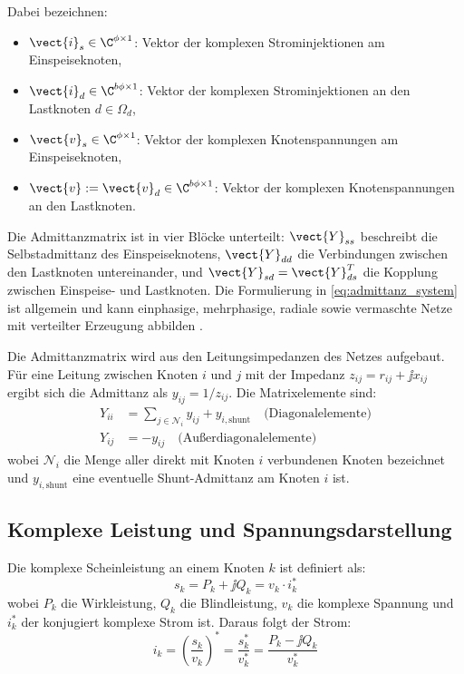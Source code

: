 Dabei bezeichnen:
\begin{itemize}
	\item $\vect{i}_s \in \C^{\phi \times 1}$: Vektor der komplexen Strominjektionen am Einspeiseknoten,
	\item $\vect{i}_d \in \C^{b\phi \times 1}$: Vektor der komplexen Strominjektionen an den Lastknoten $d \in \Omega_d$,
	\item $\vect{v}_s \in \C^{\phi \times 1}$: Vektor der komplexen Knotenspannungen am Einspeiseknoten,
	\item $\vect{v} := \vect{v}_d \in \C^{b\phi \times 1}$: Vektor der komplexen Knotenspannungen an den Lastknoten.
\end{itemize}

Die Admittanzmatrix ist in vier Blöcke unterteilt: $\vect{Y}_{ss}$ beschreibt die Selbstadmittanz des Einspeiseknotens, $\vect{Y}_{dd}$ die Verbindungen zwischen den Lastknoten untereinander, und $\vect{Y}_{sd} = \vect{Y}_{ds}^T$ die Kopplung zwischen Einspeise- und Lastknoten. Die Formulierung in \eqref{eq:admittanz_system} ist allgemein und kann einphasige, mehrphasige, radiale sowie vermaschte Netze mit verteilter Erzeugung abbilden \cite{Salazar2024}.

Die Admittanzmatrix wird aus den Leitungsimpedanzen des Netzes aufgebaut. Für eine Leitung zwischen Knoten $i$ und $j$ mit der Impedanz $z_{ij} = r_{ij} + \jj x_{ij}$ ergibt sich die Admittanz als $y_{ij} = 1/z_{ij}$. Die Matrixelemente sind:
\begin{align}
	Y_{ii} &= \sum_{j \in \mathcal{N}_i} y_{ij} + y_{i,\text{shunt}} \quad \text{(Diagonalelemente)} \label{eq:Y_diag}\\
	Y_{ij} &= -y_{ij} \quad \text{(Außerdiagonalelemente)} \label{eq:Y_offdiag}
\end{align}
wobei $\mathcal{N}_i$ die Menge aller direkt mit Knoten $i$ verbundenen Knoten bezeichnet und $y_{i,\text{shunt}}$ eine eventuelle Shunt-Admittanz am Knoten $i$ ist.

\subsection{Komplexe Leistung und Spannungsdarstellung}
\label{subsec:leistung_spannung}

Die komplexe Scheinleistung an einem Knoten $k$ ist definiert als:
\begin{equation}
	s_k = P_k + \jj Q_k = v_k \cdot i_k^*
	\label{eq:scheinleistung}
\end{equation}
wobei $P_k$ die Wirkleistung, $Q_k$ die Blindleistung, $v_k$ die komplexe Spannung und $i_k^*$ der konjugiert komplexe Strom ist. Daraus folgt der Strom:
\begin{equation}
	i_k = \left(\frac{s_k}{v_k}\right)^* = \frac{s_k^*}{v_k^*} = \frac{P_k - \jj Q_k}{v_k^*}
	\label{eq:strom_aus_leistung}
\end{equation}

